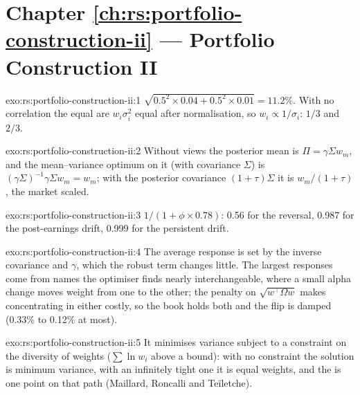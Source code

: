 \section*{Chapter \ref{ch:rs:portfolio-construction-ii} --- Portfolio Construction II}

\begin{solution}{exo:rs:portfolio-construction-ii:1}
$\sqrt{0.5^2 \times 0.04 + 0.5^2 \times 0.01} = 11.2\%$. With no correlation the equal  are $w_i\sigma_i^2$ equal after normalisation, so
$w_i \propto 1/\sigma_i$: $1/3$ and $2/3$.
\end{solution}

\begin{solution}{exo:rs:portfolio-construction-ii:2}
Without views the posterior mean is $\Pi = \gamma\Sigma w_m$, and the mean--variance optimum on it (with covariance $\Sigma$) is $(\gamma\Sigma)^{-1}\gamma\Sigma w_m = w_m$;
with the posterior covariance $(1+\tau)\Sigma$ it is $w_m/(1+\tau)$, the market scaled.
\end{solution}

\begin{solution}{exo:rs:portfolio-construction-ii:3}
$1/(1 + \phi \times 0.78)$: 0.56 for the reversal, 0.987 for the post-earnings drift, 0.999 for the persistent drift.
\end{solution}

\begin{solution}{exo:rs:portfolio-construction-ii:4}
The average response is set by the inverse covariance and $\gamma$, which the robust term changes little. The largest responses come from names the optimiser
finds nearly interchangeable, where a small alpha change moves weight from one to the other; the penalty on $\sqrt{w^\top\Omega w}$ makes concentrating in either
costly, so the book holds both and the flip is damped (0.33\% to 0.12\% at most).
\end{solution}

\begin{solution}{exo:rs:portfolio-construction-ii:5}
It minimises variance subject to a constraint on the diversity of weights ($\sum\ln w_i$ above a bound): with no constraint the solution is minimum variance,
with an infinitely tight one it is equal weights, and the  is one point on that path (Maillard, Roncalli and Teïletche).
\end{solution}

